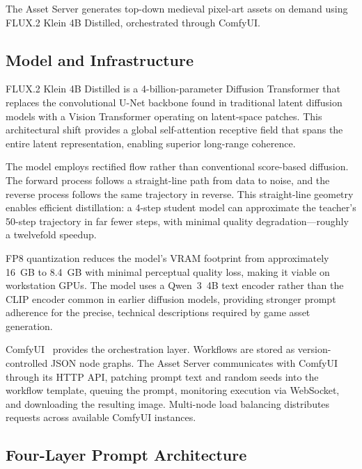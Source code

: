 \documentclass[conference]{IEEEtran}
\begin{document}
The Asset Server generates top-down medieval pixel-art assets on demand
using FLUX.2 Klein 4B Distilled, orchestrated through ComfyUI.

\subsection{Model and Infrastructure}

FLUX.2 Klein 4B Distilled is a 4-billion-parameter Diffusion Transformer
that replaces the convolutional U-Net backbone found in traditional latent
diffusion models with a Vision Transformer operating on latent-space
patches. This architectural shift provides a global self-attention
receptive field that spans the entire latent representation, enabling
superior long-range coherence.

The model employs rectified flow rather than conventional score-based
diffusion. The forward process follows a straight-line path from data to
noise, and the reverse process follows the same trajectory in reverse.
This straight-line geometry enables efficient distillation: a 4-step
student model can approximate the teacher's 50-step trajectory in far
fewer steps, with minimal quality degradation---roughly a twelvefold
speedup.

FP8 quantization reduces the model's VRAM footprint from approximately
16~GB to 8.4~GB with minimal perceptual quality loss, making it viable on
workstation GPUs. The model uses a Qwen~3~4B text encoder rather than the
CLIP encoder common in earlier diffusion models, providing stronger prompt
adherence for the precise, technical descriptions required by game asset
generation.

ComfyUI~\cite{comfyui2023} provides the orchestration layer. Workflows are stored as
version-controlled JSON node graphs. The Asset Server communicates with
ComfyUI through its HTTP API, patching prompt text and random seeds into
the workflow template, queuing the prompt, monitoring execution via
WebSocket, and downloading the resulting image. Multi-node load balancing
distributes requests across available ComfyUI instances.

\subsection{Four-Layer Prompt Architecture}
\end{document}
